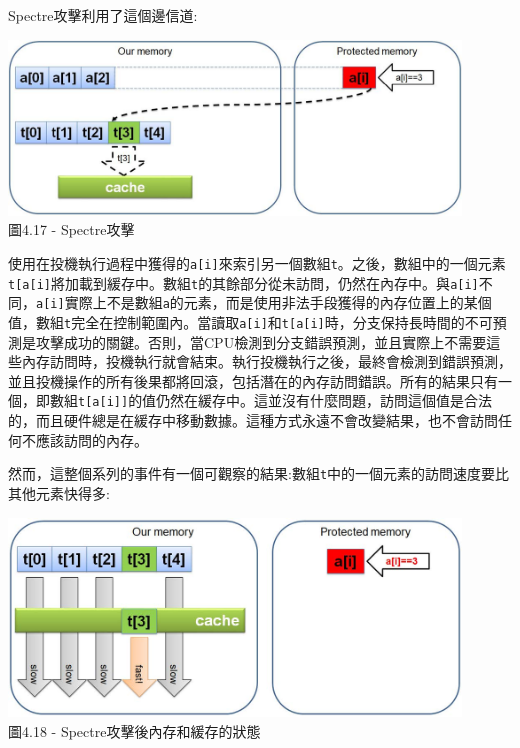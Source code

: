 Spectre攻擊利用了這個邊信道:

\begin{center}
\includegraphics[width=0.9\textwidth]{content/1/chapter4/images/17.jpg}\\
圖4.17 - Spectre攻擊
\end{center}

使用在投機執行過程中獲得的\texttt{a[i]}來索引另一個數組\texttt{t}。之後，數組中的一個元素\texttt{t[a[i]}將加載到緩存中。數組\texttt{t}的其餘部分從未訪問，仍然在內存中。與\texttt{a[i]}不同，\texttt{a[i]}實際上不是數組\texttt{a}的元素，而是使用非法手段獲得的內存位置上的某個值，數組\texttt{t}完全在控制範圍內。當讀取\texttt{a[i]}和\texttt{t[a[i]}時，分支保持長時間的不可預測是攻擊成功的關鍵。否則，當CPU檢測到分支錯誤預測，並且實際上不需要這些內存訪問時，投機執行就會結束。執行投機執行之後，最終會檢測到錯誤預測，並且投機操作的所有後果都將回滾，包括潛在的內存訪問錯誤。所有的結果只有一個，即數組\texttt{t[a[i]]}的值仍然在緩存中。這並沒有什麼問題，訪問這個值是合法的，而且硬件總是在緩存中移動數據。這種方式永遠不會改變結果，也不會訪問任何不應該訪問的內存。

然而，這整個系列的事件有一個可觀察的結果:數組\texttt{t}中的一個元素的訪問速度要比其他元素快得多:

\begin{center}
\includegraphics[width=0.9\textwidth]{content/1/chapter4/images/18.jpg}\\
圖4.18 - Spectre攻擊後內存和緩存的狀態
\end{center}

